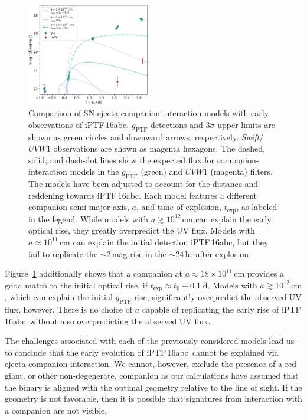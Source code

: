 \documentclass[twocolumn]{aastex61}
\newcommand{\abc}{iPTF\,16abc}
\begin{document}
\begin{figure}[!thb]
  \centering
  \includegraphics[width=0.48\textwidth]{companion_lc.pdf}
  \caption{Comparison of SN ejecta-companion interaction models 
  with early observations of \abc. $g_\mathrm{PTF}$ 
  detections and 3$\sigma$ upper limits are shown 
  as green circles and downward arrows, respectively. 
  \textit{Swift}/$UVW1$ observations are shown as magenta hexagons.
  The dashed, solid, and dash-dot lines show the expected flux 
  for companion-interaction models in the $g_\mathrm{PTF}$ (green) 
  and $UVW1$ (magenta) filters. The models have been adjusted to 
  account for the distance and reddening towards \abc. Each 
  model features a different companion semi-major axis, $a$, and 
  time of explosion, $t_\mathrm{exp}$, as labeled in the 
  legend. While models with $a \gtrsim 10^{12} \, \mathrm{cm}$ can 
  explain the early optical rise, they greatly 
  overpredict the UV flux. Models with $a \approx 10^{11} \, 
  \mathrm{cm}$ can explain the initial detection \abc, but they 
  fail to replicate the $\sim$2\,mag rise in the $\sim$24\,hr 
  after explosion.
  }
  \label{fig:SN-companion}
\end{figure}

Figure~\ref{fig:SN-companion} additionally shows that a companion at $a
\approx 18 \times 10^{11} \, \mathrm{cm}$ provides a good match to the initial
optical rise, if $t_\mathrm{exp} \approx t_0 + 0.1 \; \mathrm{d}$. Models with
$a \gtrsim 10^{12} \, \mathrm{cm}$, which can explain the initial
$g_\mathrm{PTF}$ rise, significantly overpredict the observed UV flux,
however. There is no choice of $a$ capable of replicating the early rise of
\abc\ without also overpredicting the observed UV flux.

The challenges associated with each of the previously considered models lead
us to conclude that the early evolution of \abc\ cannot be explained via
ejecta-companion interaction. We cannot, however, exclude the presence of a
red-giant, or other non-degenerate, companion as our calculations have assumed
that the binary is aligned with the optimal geometry relative to the line of
sight. If the geometry is not favorable, then it is possible that signatures
from interaction with a companion are not visible.
\end{document}
